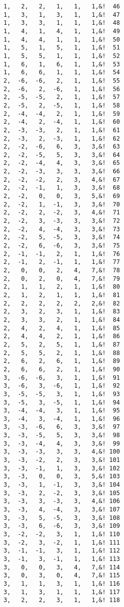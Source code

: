 \begin{Verbatim}
  1,   2,   2,   1,   1,   1,&!  46
  1,   3,   1,   3,   1,   1,&!  47
  1,   3,   3,   1,   1,   1,&!  48
  1,   4,   1,   4,   1,   1,&!  49
  1,   4,   4,   1,   1,   1,&!  50
  1,   5,   1,   5,   1,   1,&!  51
  1,   5,   5,   1,   1,   1,&!  52
  1,   6,   1,   6,   1,   1,&!  53
  1,   6,   6,   1,   1,   1,&!  54
  2,  -6,  -6,   2,   1,   1,&!  55
  2,  -6,   2,  -6,   1,   1,&!  56
  2,  -5,  -5,   2,   1,   1,&!  57
  2,  -5,   2,  -5,   1,   1,&!  58
  2,  -4,  -4,   2,   1,   1,&!  59
  2,  -4,   2,  -4,   1,   1,&!  60
  2,  -3,  -3,   2,   1,   1,&!  61
  2,  -3,   2,  -3,   1,   1,&!  62
  2,  -2,  -6,   6,   3,   3,&!  63
  2,  -2,  -5,   5,   3,   3,&!  64
  2,  -2,  -4,   4,   3,   3,&!  65
  2,  -2,  -3,   3,   3,   3,&!  66
  2,  -2,  -2,   2,   3,   4,&!  67
  2,  -2,  -1,   1,   3,   3,&!  68
  2,  -2,   0,   0,   3,   5,&!  69
  2,  -2,   1,  -1,   3,   3,&!  70
  2,  -2,   2,  -2,   3,   4,&!  71
  2,  -2,   3,  -3,   3,   3,&!  72
  2,  -2,   4,  -4,   3,   3,&!  73
  2,  -2,   5,  -5,   3,   3,&!  74
  2,  -2,   6,  -6,   3,   3,&!  75
  2,  -1,  -1,   2,   1,   1,&!  76
  2,  -1,   2,  -1,   1,   1,&!  77
  2,   0,   0,   2,   4,   7,&!  78
  2,   0,   2,   0,   4,   7,&!  79
  2,   1,   1,   2,   1,   1,&!  80
  2,   1,   2,   1,   1,   1,&!  81
  2,   2,   2,   2,   2,   2,&!  82
  2,   3,   2,   3,   1,   1,&!  83
  2,   3,   3,   2,   1,   1,&!  84
  2,   4,   2,   4,   1,   1,&!  85
  2,   4,   4,   2,   1,   1,&!  86
  2,   5,   2,   5,   1,   1,&!  87
  2,   5,   5,   2,   1,   1,&!  88
  2,   6,   2,   6,   1,   1,&!  89
  2,   6,   6,   2,   1,   1,&!  90
  3,  -6,  -6,   3,   1,   1,&!  91
  3,  -6,   3,  -6,   1,   1,&!  92
  3,  -5,  -5,   3,   1,   1,&!  93
  3,  -5,   3,  -5,   1,   1,&!  94
  3,  -4,  -4,   3,   1,   1,&!  95
  3,  -4,   3,  -4,   1,   1,&!  96
  3,  -3,  -6,   6,   3,   3,&!  97
  3,  -3,  -5,   5,   3,   3,&!  98
  3,  -3,  -4,   4,   3,   3,&!  99
  3,  -3,  -3,   3,   3,   4,&! 100
  3,  -3,  -2,   2,   3,   3,&! 101
  3,  -3,  -1,   1,   3,   3,&! 102
  3,  -3,   0,   0,   3,   5,&! 103
  3,  -3,   1,  -1,   3,   3,&! 104
  3,  -3,   2,  -2,   3,   3,&! 105
  3,  -3,   3,  -3,   3,   4,&! 106
  3,  -3,   4,  -4,   3,   3,&! 107
  3,  -3,   5,  -5,   3,   3,&! 108
  3,  -3,   6,  -6,   3,   3,&! 109
  3,  -2,  -2,   3,   1,   1,&! 110
  3,  -2,   3,  -2,   1,   1,&! 111
  3,  -1,  -1,   3,   1,   1,&! 112
  3,  -1,   3,  -1,   1,   1,&! 113
  3,   0,   0,   3,   4,   7,&! 114
  3,   0,   3,   0,   4,   7,&! 115
  3,   1,   1,   3,   1,   1,&! 116
  3,   1,   3,   1,   1,   1,&! 117
  3,   2,   2,   3,   1,   1,&! 118

\end{Verbatim}
